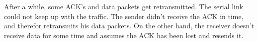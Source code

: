 After a while, some ACK's and data packets get retransmitted. The serial link could not keep up with the traffic. The sender didn't receive the ACK in time, and therefor retransmits his data packets. On the other hand, the receiver doesn't receive data for some time and assumes the ACK has been lost and resends it.